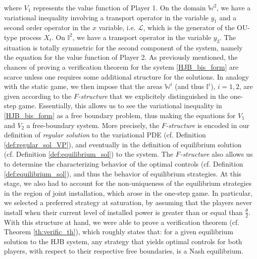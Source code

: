 \documentclass[10pt]{article}
\numberwithin{equation}{section}
\theoremstyle{plain}
\numberwithin{theorem}{section}
\theoremstyle{definition}
\newcommand{\<}{\langle}
\renewcommand{\>}{\rangle}
\renewcommand{\(}{\left(}
\renewcommand{\)}{\right)}
\def\cL{{\mathcal L}}
\begin{document}
{where $V_1$ represents the value function of Player 1. On the domain $\mathbb{W}^2$, we have a variational inequality involving a transport operator in the variable $y_1$ and a second order operator in the $x$ variable, i.e. $\cL$, which is the generator of the OU-type process $X_t$. On $\mathbb{I}^2$, we have a transport operator in the variable $y_2$. The situation is totally symmetric for the second component of the system, namely the equation for the value function of Player 2. As previously mentioned, the chances of proving a verification theorem for the system \eqref{HJB_bis_form} are scarce unless one requires some additional structure for the solutions. In analogy with the static game, we then impose that the areas $\mathbb{W}^i$ (and thus $\mathbb{I}^i$), $i=1,2$, are given according to the \emph{$F$-structure} that we explicitely distinguished in the one-step game. Essentially, this allows us to see the variational inequality in \eqref{HJB_bis_form} as a free boundary problem, thus making the equations for $V_1$ and $V_2$ a free-boundary system. More precisely, the \emph{$F$-structure} is encoded in our definition of \emph{regular solution} to the variational PDE (cf. Definition \ref{def:regular_sol_VP}), and eventually in the definition of equilibrium solution (cf. Definition \ref{def:equilibrium_sol}) to the system. The \emph{$F$-structure} also allows us to determine the characterizing behavior of the optimal controls (cf. Definition \ref{def:equilibrium_sol}), and thus the behavior of equilibrium strategies. At this stage, we also had to account for the non-uniqueness of the equilibrium strategies in the region of joint installation, which arose in the one-step game. In particular, we selected a preferred strategy at saturation, by assuming that the players never install when their current level of installed power is greater than or equal than $\frac{\theta}{2}$. With this structure at hand, we were able to prove a verification theorem (cf. Theorem \ref{th:verific_th}), which roughly states that: for a given equilibrium solution to the HJB system, %
any strategy that yields optimal controls for both players, with respect to their respective free boundaries, is a Nash equilibrium. 

}
\end{document}
